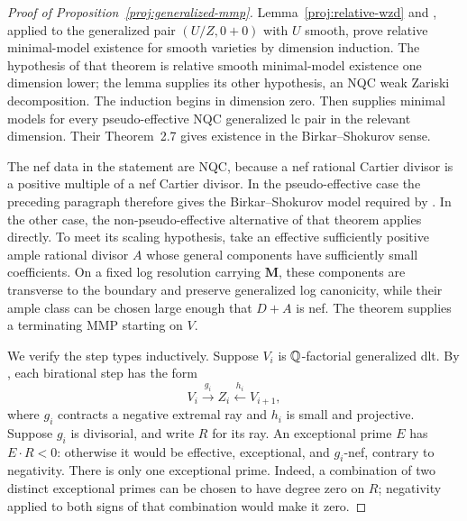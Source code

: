 \begin{proof}[Proof of Proposition~\ref{proj:generalized-mmp}]
Lemma~\ref{proj:relative-wzd} and
\cite[Theorem~5.2]{TsakanikasXie}, applied to the generalized pair
\((U/Z,0+0)\) with \(U\) smooth, prove relative minimal-model existence for smooth varieties
by dimension induction. The hypothesis of that theorem is relative smooth
minimal-model existence one dimension lower; the lemma supplies its other
hypothesis, an NQC weak Zariski decomposition. The induction begins in
dimension zero. Then \cite[Theorem~5.4]{TsakanikasXie} supplies minimal
models for every pseudo-effective NQC generalized lc pair in the relevant
dimension. Their Theorem~2.7 gives existence in the Birkar--Shokurov sense.

The nef data in the statement are NQC, because a nef rational Cartier
divisor is a positive multiple of a nef Cartier divisor. In the
pseudo-effective case the preceding paragraph therefore gives the
Birkar--Shokurov model required by
\cite[Theorem~4.2]{TsakanikasXie}. In the other case, the non-pseudo-effective
alternative of that theorem applies directly. To meet its scaling
hypothesis, take an effective sufficiently positive ample rational divisor
\(A\) whose general components have sufficiently small coefficients. On
a fixed log resolution carrying \(\boldsymbol M\), these components are
transverse to the boundary and preserve generalized log canonicity, while
their ample class can be chosen large enough that \(D+A\) is nef. The
theorem supplies a terminating MMP starting on \(V\).

We verify the step types inductively.  Suppose \(V_i\) is
\(\mathbb Q\)-factorial generalized dlt.  By
\cite[Remark~2.15]{TsakanikasXie}, each birational step has the form
\[
 V_i\xrightarrow{g_i}Z_i\xleftarrow{h_i}V_{i+1},
\]
where \(g_i\) contracts a negative extremal ray and \(h_i\) is small and projective.
Suppose \(g_i\) is divisorial, and write \(R\) for its ray.  An exceptional
prime \(E\) has \(E\cdot R<0\): otherwise it would be effective,
exceptional, and \(g_i\)-nef, contrary to negativity.  There is only one
exceptional prime.  Indeed, a combination of two distinct exceptional
primes can be chosen to have degree zero on \(R\); negativity applied to
both signs of that combination would make it zero.


\end{proof}
